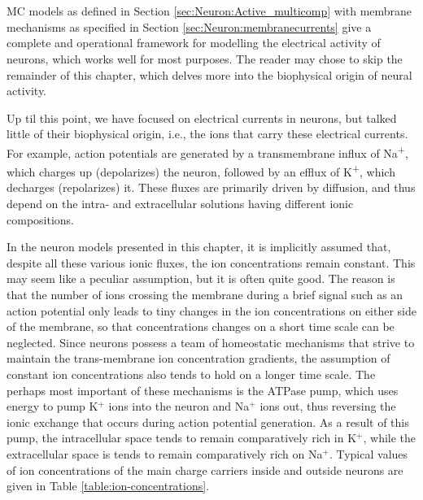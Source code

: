 


\section{}
\label{sec:Neuron:Ions_and_reversals}
MC models as defined in Section \ref{sec:Neuron:Active_multicomp} with membrane mechanisms as specified in Section \ref{sec:Neuron:membranecurrents} give a complete and operational framework for modelling the electrical activity of neurons, which works well for most purposes. The reader may chose to skip the remainder of this chapter, which delves more into the biophysical origin of neural activity. 

Up til this point, we have focused on electrical currents in neurons, but talked little of their biophysical origin, i.e., the ions that carry these electrical currents. For example, action potentials are generated by a transmembrane influx of Na\textsuperscript{+}, which charges up (depolarizes) the neuron, followed by an efflux of K\textsuperscript{+}, which decharges (repolarizes) it. These fluxes are primarily driven by diffusion, and thus depend on the intra- and extracellular solutions having different ionic compositions. 

In the neuron models presented in this chapter, it is implicitly assumed that, despite all these various ionic fluxes, the ion concentrations remain constant. This may seem like a peculiar assumption, but it is often quite good. The reason is that the number of ions crossing the membrane during a brief signal such as an action potential only leads to tiny changes in the ion concentrations on either side of the membrane, so that concentrations changes on a short time scale can be neglected. Since neurons possess a team of homeostatic mechanisms that strive to maintain the trans-membrane ion concentration gradients, the
assumption of constant ion concentrations also tends to hold on a longer time scale.  The perhaps most important of these mechanisms is the ATPase pump, which uses energy to pump K$^+$ ions into the neuron and Na$^+$ ions out, thus reversing the ionic exchange that occurs during action potential generation. As a result of this pump, the intracellular space tends to remain comparatively rich in K$^+$, while the extracellular space is tends to remain comparatively rich on Na$^+$. Typical values of ion concentrations of the main charge carriers inside and outside neurons are given in Table \ref{table:ion-concentrations}. 

